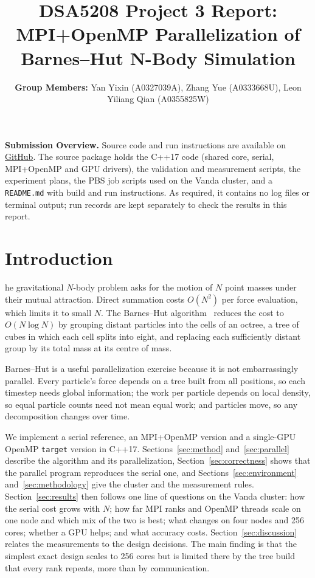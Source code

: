 \documentclass[10pt,a4paper,twocolumn,twoside]{rho-class/rho}
\title{DSA5208 Project 3 Report: MPI+OpenMP Parallelization of Barnes--Hut N-Body Simulation}
\author{\textbf{Group Members: }Yan Yixin (A0327039A), Zhang Yue (A0333668U), Leon Yiliang Qian (A0355825W)}
\begin{document}
    \maketitle
    \thispagestyle{firststyle}


\noindent\textbf{Submission Overview.} Source code and run instructions are available on \href{https://github.com/leonyiliangqian/dsa5208-project3}{GitHub}. The source package holds the C++17 code (shared core, serial, MPI+OpenMP and GPU drivers), the validation and measurement scripts, the experiment plans, the PBS job scripts used on the Vanda cluster, and a \texttt{README.md} with build and run instructions. As required, it contains no log files or terminal output; run records are kept separately to check the results in this report.

\section{Introduction}
he gravitational $N$-body problem asks for the motion of $N$ point masses under their mutual attraction. Direct summation costs $O(N^2)$ per force evaluation, which limits it to small $N$. The Barnes--Hut algorithm~\cite{BarnesHut1986} reduces the cost to $O(N \log N)$ by grouping distant particles into the cells of an octree, a tree of cubes in which each cell splits into eight, and replacing each sufficiently distant group by its total mass at its centre of mass.

Barnes--Hut is a useful parallelization exercise because it is not embarrassingly parallel. Every particle's force depends on a tree built from all positions, so each timestep needs global information; the work per particle depends on local density, so equal particle counts need not mean equal work; and particles move, so any decomposition changes over time.

We implement a serial reference, an MPI+OpenMP version and a single-GPU OpenMP \texttt{target} version in C++17. Sections~\ref{sec:method} and~\ref{sec:parallel} describe the algorithm and its parallelization, Section~\ref{sec:correctness} shows that the parallel program reproduces the serial one, and Sections~\ref{sec:environment} and~\ref{sec:methodology} give the cluster and the measurement rules. Section~\ref{sec:results} then follows one line of questions on the Vanda cluster: how the serial cost grows with $N$; how far MPI ranks and OpenMP threads scale on one node and which mix of the two is best; what changes on four nodes and 256 cores; whether a GPU helps; and what accuracy costs. Section~\ref{sec:discussion} relates the measurements to the design decisions. The main finding is that the simplest exact design scales to 256 cores but is limited there by the tree build that every rank repeats, more than by communication.
\end{document}
